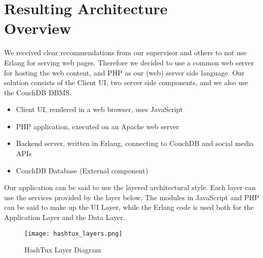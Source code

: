 \chapter[Resulting Architecture Overview]{Resulting Architecture\\ Overview}
We received clear recommendations from our supervisor and others to not use
Erlang for serving web pages. Therefore we decided to use a common web server
for hosting the web content, and PHP as our (web) server side language. Our
solution consists of the Client UI, two server side components, and we also use
the CouchDB DBMS.
\begin{itemize}
  \item Client UI, rendered in a web browser, uses JavaScript
  \item PHP application, executed on an Apache web server
  \item Backend server, written in Erlang, connecting to CouchDB and social
     media APIs
  \item CouchDB Database (External component)
\end{itemize}
Our application can be said to use the layered architectural style. Each layer
can use the services provided by the layer below. The modules in JavaScript and
PHP can be said to make up the UI Layer, while the Erlang code is used both for
the Application Layer and the Data Layer. \newline

\begin{figure}[ht]
  \centering
  \texttt{[image: hashtux\_layers.png]}
  \caption{HashTux Layer Diagram}
\end{figure}